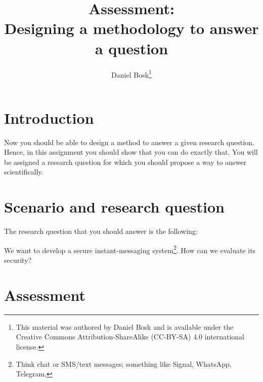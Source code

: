 \title{%
  Assessment:\\
  Designing a methodology to answer a question
}
\author{Daniel Bosk\thanks{%
   This material was authored by Daniel Bosk and is available under the 
   Creative Commons Attribution-ShareAlike (CC-BY-SA) 4.0 international 
   license.
}}

\mode*

\begin{frame}
  \maketitle
\end{frame}

\begin{abstract}
  
\end{abstract}

\clearpage


\section{Introduction}

Now you should be able to design a method to answer a given research question.
Hence, in this assignment you should show that you can do exactly that.
You will be assigned a research question for which you should propose a way to 
answer scientifically.

%
%
%

\section{Scenario and research question}

The research question that you should answer is the following:
\begin{question}
  We want to develop a secure instant-messaging system\footnote{%
    Think chat or SMS/text messages; something like Signal, WhatsApp, Telegram, 
    \etc
  }.
  How can we evaluate its security?
\end{question}

\section{Assessment}\label{Assessment}

